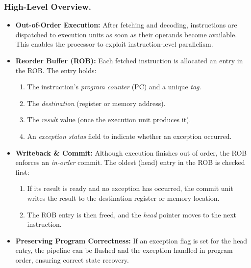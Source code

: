 \subsubsection{High-Level Overview.}
\begin{itemize}
  \item \textbf{Out-of-Order Execution:} After fetching and decoding, instructions are dispatched to execution units as soon as their operands become available. This enables the processor to exploit instruction-level parallelism.
  \item \textbf{Reorder Buffer (ROB):} Each fetched instruction is allocated an entry in the ROB. The entry holds:
    \begin{enumerate}
      \item The instruction’s \emph{program counter} (PC) and a unique \emph{tag}.
      \item The \emph{destination} (register or memory address).
      \item The \emph{result} value (once the execution unit produces it).
      \item An \emph{exception status} field to indicate whether an exception occurred.
    \end{enumerate}
  \item \textbf{Writeback \& Commit:} Although execution finishes out of order, the ROB enforces an \emph{in-order} commit. The oldest (head) entry in the ROB is checked first:
    \begin{enumerate}
      \item If its result is ready and no exception has occurred, the commit unit writes the result to the destination register or memory location.
      \item The ROB entry is then freed, and the \emph{head} pointer moves to the next instruction.
    \end{enumerate}
  \item \textbf{Preserving Program Correctness:} If an exception flag is set for the head entry, the pipeline can be flushed and the exception handled in program order, ensuring correct state recovery.
\end{itemize}

